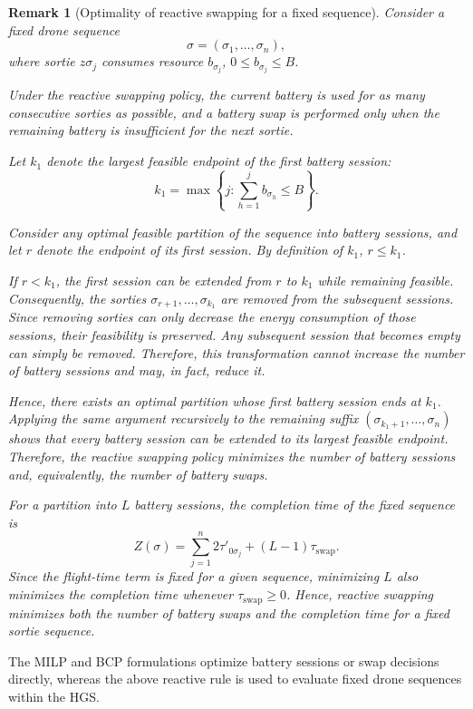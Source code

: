\documentclass[3p, authoryear, 11pt]{elsarticle}
\newtheorem{remark}{Remark}
\begin{document}
\begin{remark}[Optimality of reactive swapping for a fixed sequence]
Consider a fixed drone sequence
\[
\sigma=(\sigma_1,\ldots,\sigma_n),
\]
where sortie $z\sigma_j$ consumes resource $b_{\sigma_j}$, 
$0 \le b_{\sigma_j} \le B$.

Under the reactive swapping policy, the current battery is used for as many consecutive sorties as possible, and a battery swap is performed only when the remaining battery is insufficient for the next sortie.

Let $k_1$ denote the largest feasible endpoint of the first battery session:
\[
k_1
=
\max
\left\{
j :
\sum_{h=1}^{j} b_{\sigma_h} \le B
\right\}.
\]

Consider any optimal feasible partition of the sequence into battery sessions, and let $r$ denote the endpoint of its first session. By definition of $k_1$,
$r \le k_1$.

If $r < k_1$, the first session can be extended from $r$ to $k_1$ while remaining feasible. Consequently, the sorties
$\sigma_{r+1},\ldots,\sigma_{k_1}$
are removed from the subsequent sessions. Since removing sorties can only decrease the energy consumption of those sessions, their feasibility is preserved. Any subsequent session that becomes empty can simply be removed. Therefore, this transformation cannot increase the number of battery sessions and may, in fact, reduce it.

Hence, there exists an optimal partition whose first battery session ends at $k_1$. Applying the same argument recursively to the remaining suffix
$(\sigma_{k_1+1},\ldots,\sigma_n)$ 
shows that every battery session can be extended to its largest feasible endpoint. Therefore, the reactive swapping policy minimizes the number of battery sessions and, equivalently, the number of battery swaps.

For a partition into $L$ battery sessions, the completion time of the fixed sequence is
\[
Z(\sigma)
=
\sum_{j=1}^{n} 2\tau'_{0\sigma_j}
+
(L-1)\tau_{\mathrm{swap}}.
\]
Since the flight-time term is fixed for a given sequence, minimizing $L$ also minimizes the completion time whenever
$\tau_{\mathrm{swap}} \ge 0$.
Hence, reactive swapping minimizes both the number of battery swaps and the completion time for a fixed sortie sequence.
\end{remark}

The MILP and BCP formulations optimize battery sessions or swap decisions directly, whereas the above reactive rule is used to evaluate fixed drone sequences within the HGS.
\end{document}
